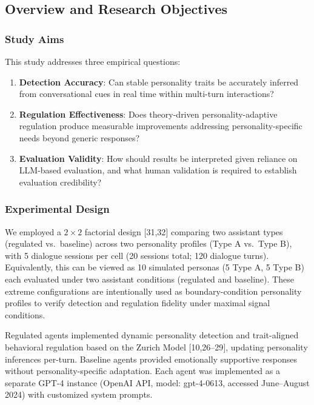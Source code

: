 \documentclass[apajournal,article,submit,moreauthors]{Definitions/mdpi}
\begin{document}
\subsection{Overview and Research Objectives}\label{overview-and-research-objectives}

\subsubsection{Study Aims}\label{study-aims}

This study addresses three empirical questions:

\begin{enumerate}
\def\labelenumi{\arabic{enumi}.}
\item
  \textbf{Detection Accuracy}: Can stable personality traits be accurately inferred from conversational cues in real time within multi-turn interactions?
\item
  \textbf{Regulation Effectiveness}: Does theory-driven personality-adaptive regulation produce measurable improvements addressing personality-specific needs beyond generic responses?
\item
  \textbf{Evaluation Validity}: How should results be interpreted given reliance on LLM-based evaluation, and what human validation is required to establish evaluation credibility?
\end{enumerate}

\subsubsection{Experimental Design}\label{experimental-design}

We employed a $2 \times 2$ factorial design {[}31,32{]} comparing two assistant types (regulated vs.~baseline) across two personality profiles (Type A vs.~Type B), with 5 dialogue sessions per cell (20 sessions total; 120 dialogue turns). Equivalently, this can be viewed as 10 simulated personas (5 Type A, 5 Type B) each evaluated under two assistant conditions (regulated and baseline). These extreme configurations are intentionally used as boundary-condition personality profiles to verify detection and regulation fidelity under maximal signal conditions.

Regulated agents implemented dynamic personality detection and trait-aligned behavioral regulation based on the Zurich Model {[}10,26--29{]}, updating personality inferences per-turn. Baseline agents provided emotionally supportive responses without personality-specific adaptation. Each agent was implemented as a separate GPT-4 instance (OpenAI API, model: gpt-4-0613, accessed June--August 2024) with customized system prompts.
\end{document}
